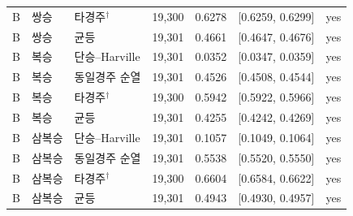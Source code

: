 \begin{tabular}{lllrrrr}
B & 쌍승 & 타경주$^{\dagger}$ & 19,300 & 0.6278 & [0.6259, 0.6299] & yes \\
B & 쌍승 & 균등 & 19,301 & 0.4661 & [0.4647, 0.4676] & yes \\
B & 복승 & 단승--Harville & 19,301 & 0.0352 & [0.0347, 0.0359] & yes \\
B & 복승 & 동일경주 순열 & 19,301 & 0.4526 & [0.4508, 0.4544] & yes \\
B & 복승 & 타경주$^{\dagger}$ & 19,300 & 0.5942 & [0.5922, 0.5966] & yes \\
B & 복승 & 균등 & 19,301 & 0.4255 & [0.4242, 0.4269] & yes \\
B & 삼복승 & 단승--Harville & 19,301 & 0.1057 & [0.1049, 0.1064] & yes \\
B & 삼복승 & 동일경주 순열 & 19,301 & 0.5538 & [0.5520, 0.5550] & yes \\
B & 삼복승 & 타경주$^{\dagger}$ & 19,300 & 0.6604 & [0.6584, 0.6622] & yes \\
B & 삼복승 & 균등 & 19,301 & 0.4943 & [0.4930, 0.4957] & yes \\
\bottomrule
\end{tabular}
